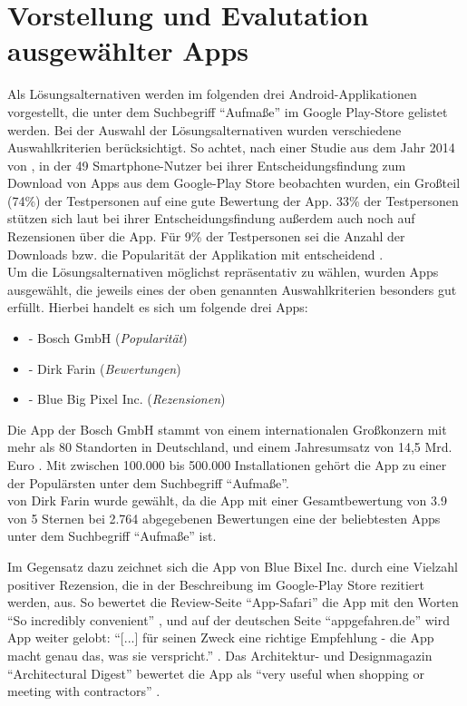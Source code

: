 \section{Vorstellung und Evalutation ausgewählter Apps}\label{sec:evaluation}
Als Lösungsalternativen werden im folgenden drei Android-Applikationen vorgestellt, die unter dem Suchbegriff ``Aufmaße'' im Google Play-Store gelistet werden.
Bei der Auswahl der Lösungsalternativen wurden verschiedene Auswahlkriterien berücksichtigt.
So achtet, nach einer Studie aus dem Jahr 2014 von \citeauthor{Dogruel14}, in der 49 Smartphone-Nutzer bei ihrer Entscheidungsfindung zum Download von Apps aus dem Google-Play Store beobachten wurden, ein Großteil (74\%) der Testpersonen auf eine gute Bewertung der App.
33\% der Testpersonen stützen sich laut \citeauthor{Dogruel14} bei ihrer Entscheidungsfindung außerdem auch noch auf Rezensionen über die App.
Für 9\% der Testpersonen sei die Anzahl der Downloads bzw. die Popularität der Applikation mit entscheidend \citep{Dogruel14}. \\

Um die Lösungsalternativen möglichst repräsentativ zu wählen, wurden Apps ausgewählt, die jeweils eines der oben genannten Auswahlkriterien besonders gut erfüllt. 
Hierbei handelt es sich um folgende drei Apps:

\begin{itemize}
  \item \mm{} - Bosch GmbH (\textit{Popularität})
  \item \im{} - Dirk Farin (\textit{Bewertungen})
  \item \pm{} - Blue Big Pixel Inc. (\textit{Rezensionen})
\end{itemize}

\noindent
Die App \mm{} der Bosch GmbH stammt von einem internationalen Großkonzern mit mehr als 80 Standorten in Deutschland, und einem Jahresumsatz von 14,5 Mrd. Euro \citep{Bosch18}.
Mit zwischen 100.000 bis 500.000 Installationen gehört die App zu einer der Populärsten unter dem Suchbegriff ``Aufmaße''. \\

\im{} von Dirk Farin wurde gewählt, da die App mit einer Gesamtbewertung von 3.9 von 5 Sternen bei 2.764 abgegebenen Bewertungen eine der beliebtesten Apps unter dem Suchbegriff ``Aufmaße'' ist.

Im Gegensatz dazu zeichnet sich die App \pm{} von Blue Bixel Inc. durch eine Vielzahl positiver Rezension, die in der Beschreibung im Google-Play Store rezitiert werden, aus.
So bewertet die Review-Seite ``App-Safari'' die App mit den Worten ``So incredibly convenient'' \citep{AppSafari18}, und auf der deutschen Seite ``appgefahren.de'' wird App weiter gelobt: 
``[...] für seinen Zweck eine richtige Empfehlung - die App macht genau das, was sie verspricht.'' \citep{Appgefahren18}.
Das Architektur- und Designmagazin ``Architectural Digest'' bewertet die App als ``very useful when shopping or meeting with contractors'' \citep{Architekt18}.

